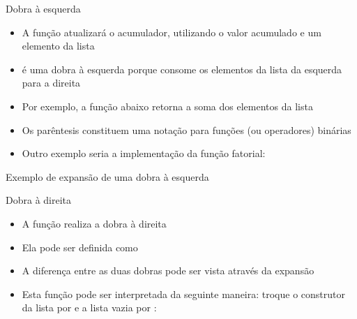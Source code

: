 \begin{frame}[fragile]{Dobra à esquerda}

    \begin{itemize}
        \item A função  atualizará o acumulador, utilizando o valor acumulado
            e um elemento da lista

        \item {} é uma dobra à esquerda porque consome os elementos da lista
            da esquerda para a direita

        \item Por exemplo, a função  abaixo retorna a soma dos elementos
            da lista 


        \item Os parêntesis constituem uma notação para funções (ou operadores) binárias

        \item Outro exemplo seria a implementação da função fatorial:

    \end{itemize}

\end{frame}

\begin{frame}[fragile]{Exemplo de expansão de uma dobra à esquerda}
\end{frame}

\begin{frame}[fragile]{Dobra à direita}

    \begin{itemize}
        \item A função  realiza a dobra à direita

        \item Ela pode ser definida como


        \item A diferença entre as duas dobras pode ser vista através da expansão 


        \item Esta função pode ser interpretada da seguinte maneira: troque o construtor da
            lista por  e a lista vazia por :

    \end{itemize}

\end{frame}


